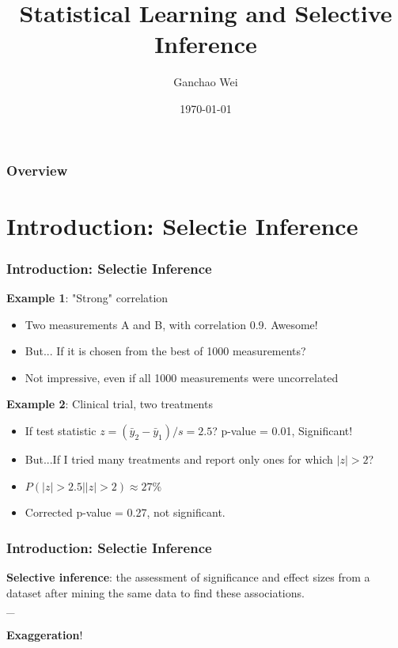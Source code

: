 \documentclass{beamer}
\title[Selective Inference]{Statistical Learning and Selective Inference} %
\author{Ganchao Wei} %
\date{\today} %
\begin{document}
\begin{frame}
\titlepage %
\end{frame}

\begin{frame}
\frametitle{Overview} %
\tableofcontents
\end{frame}


\section{Introduction: Selectie Inference}

\begin{frame}
\frametitle{Introduction: Selectie Inference}
\textbf{Example 1}: "Strong" correlation
\begin{itemize}
	\item
	Two measurements A and B, with correlation 0.9. Awesome!
	\item
	But... If it is chosen from the best of 1000 measurements?
	\item
	Not impressive, even if all 1000 measurements were uncorrelated
\end{itemize}
\textbf{Example 2}: Clinical trial, two treatments	
\begin{itemize}
	\item
	If test statistic $z = (\bar{y}_2 - \bar{y}_1)/s = 2.5$? p-value = 0.01, Significant!
	\item
	But...If I tried many treatments and report only ones for which $|z|>2$?
	\item
	$P(|z|>2.5| |z|>2) \approx 27\%$
	\item
	Corrected p-value  = 0.27, not significant.
\end{itemize}
\end{frame}


\begin{frame}
\frametitle{Introduction: Selectie Inference}
\textbf{Selective inference}: the assessment of significance and effect sizes from a dataset after mining the same data to find these associations.\\
\_
\centerline{\textbf{Exaggeration}!}
\end{frame}
\end{document}
